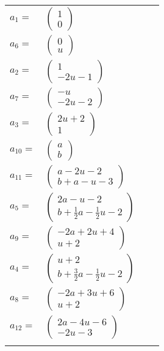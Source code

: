 \documentclass[1p]{elsarticle_modified}
\theoremstyle{definition}
\begin{document}
\begin{tabular}{m{7pt} m{180pt} m{7pt} m{180pt} }
\flushright $a_{1}=$&$\begin{pmatrix}1\\0\end{pmatrix}$ \\
\flushright $a_{6}=$&$\begin{pmatrix}0\\u\end{pmatrix}$ \\
\flushright $a_{2}=$&$\begin{pmatrix}1\\-2 u-1\end{pmatrix}$ \\
\flushright $a_{7}=$&$\begin{pmatrix}- u\\-2 u-2\end{pmatrix}$ \\
\flushright $a_{3}=$&$\begin{pmatrix}2 u+2\\1\end{pmatrix}$ \\
\flushright $a_{10}=$&$\begin{pmatrix}a\\b\end{pmatrix}$ \\
\flushright $a_{11}=$&$\begin{pmatrix}a-2 u-2\\b+a- u-3\end{pmatrix}$ \\
\flushright $a_{5}=$&$\begin{pmatrix}2 a- u-2\\b+\frac{1}{2} a-\frac{1}{2} u-2\end{pmatrix}$ \\
\flushright $a_{9}=$&$\begin{pmatrix}-2 a+2 u+4\\u+2\end{pmatrix}$ \\
\flushright $a_{4}=$&$\begin{pmatrix}u+2\\b+\frac{3}{2} a-\frac{1}{2} u-2\end{pmatrix}$ \\
\flushright $a_{8}=$&$\begin{pmatrix}-2 a+3 u+6\\u+2\end{pmatrix}$ \\
\flushright $a_{12}=$&$\begin{pmatrix}2 a-4 u-6\\-2 u-3\end{pmatrix}$\\&\end{tabular}
\end{document}
